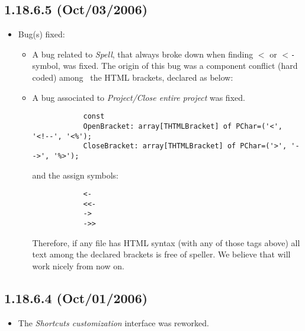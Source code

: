 \subsection{1.18.6.5 (Oct/03/2006)}

\begin{itemize}
  \item Bug(s) fixed:
    \begin{itemize}
      \item A bug related to \textit{Spell}, that always broke down when
        finding \texttt{$<$} or \texttt{$<$-} symbol, was fixed. The
        origin of this bug was a component conflict (hard coded) among \
        the HTML brackets, declared as below:
      \item A bug associated to \textit{Project/Close entire project} was fixed.

        \begin{footnotesize}
          \begin{verbatim}
            const
            OpenBracket: array[THTMLBracket] of PChar=('<', '<!--', '<%');
            CloseBracket: array[THTMLBracket] of PChar=('>', '-->', '%>');
          \end{verbatim}
        \end{footnotesize}

        and the \RR{} assign symbols:

        \begin{footnotesize}
          \begin{verbatim}
            <-
            <<-
            ->
            ->>
          \end{verbatim}
        \end{footnotesize}

        Therefore, if any file has HTML syntax (with any of those tags above) all
        text among the declared brackets is free of speller. We believe that will
        work nicely from now on.
    \end{itemize}
\end{itemize}


\subsection{1.18.6.4 (Oct/01/2006)}

\begin{itemize}
  \item The \textit{Shortcuts customization} interface was reworked.
\end{itemize}


